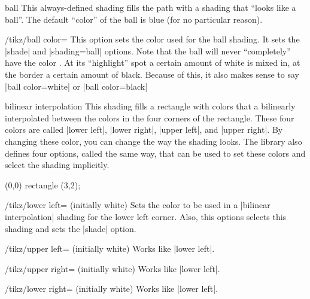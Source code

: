 \begin{shading}{ball}
    This always-defined shading fills the path with a shading that ``looks like
    a ball''. The default ``color'' of the ball is blue (for no particular
    reason).

    \begin{key}{/tikz/ball color=}
        This option sets the color used for the ball shading. It sets the
        |shade| and |shading=ball| options. Note that the ball will never
        ``completely'' have the color . At its ``highlight'' spot a
        certain amount of white is mixed in, at the border a certain amount of
        black. Because of this, it also makes sense to say |ball color=white|
        or |ball color=black|
\begin{codeexample}[]
\end{codeexample}
    \end{key}
\end{shading}

\begin{shading}{bilinear interpolation}
    This shading fills a rectangle with colors that a bilinearly interpolated
    between the colors in the four corners of the rectangle. These four colors
    are called |lower left|, |lower right|, |upper left|, and |upper right|. By
    changing these color, you can change the way the shading looks. The library
    also defines four options, called the same way, that can be used to set
    these colors and select the shading implicitly.
\begin{codeexample}[]
\tikz
  \shade[upper left=red,upper right=green,
         lower left=blue,lower right=yellow]
    (0,0) rectangle (3,2);
\end{codeexample}

    \begin{key}{/tikz/lower left= (initially white)}
        Sets the color to be used in a |bilinear interpolation| shading for the
        lower left corner. Also, this options selects this shading and sets the
        |shade| option.
    \end{key}

    \begin{key}{/tikz/upper left= (initially white)}
        Works like |lower left|.
    \end{key}

    \begin{key}{/tikz/upper right= (initially white)}
        Works like |lower left|.
    \end{key}

    \begin{key}{/tikz/lower right= (initially white)}
        Works like |lower left|.
    \end{key}
\end{shading}

